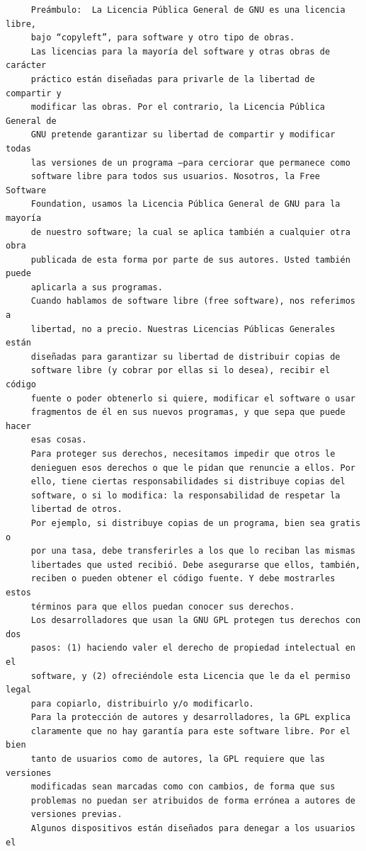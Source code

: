 \begin{verbatim}
     Preámbulo:  La Licencia Pública General de GNU es una licencia libre,
     bajo “copyleft”, para software y otro tipo de obras.
     Las licencias para la mayoría del software y otras obras de carácter
     práctico están diseñadas para privarle de la libertad de compartir y
     modificar las obras. Por el contrario, la Licencia Pública General de
     GNU pretende garantizar su libertad de compartir y modificar todas
     las versiones de un programa –para cerciorar que permanece como
     software libre para todos sus usuarios. Nosotros, la Free Software
     Foundation, usamos la Licencia Pública General de GNU para la mayoría
     de nuestro software; la cual se aplica también a cualquier otra obra
     publicada de esta forma por parte de sus autores. Usted también puede
     aplicarla a sus programas.
     Cuando hablamos de software libre (free software), nos referimos a
     libertad, no a precio. Nuestras Licencias Públicas Generales están
     diseñadas para garantizar su libertad de distribuir copias de
     software libre (y cobrar por ellas si lo desea), recibir el código
     fuente o poder obtenerlo si quiere, modificar el software o usar
     fragmentos de él en sus nuevos programas, y que sepa que puede hacer
     esas cosas.
     Para proteger sus derechos, necesitamos impedir que otros le
     denieguen esos derechos o que le pidan que renuncie a ellos. Por
     ello, tiene ciertas responsabilidades si distribuye copias del
     software, o si lo modifica: la responsabilidad de respetar la
     libertad de otros.
     Por ejemplo, si distribuye copias de un programa, bien sea gratis o
     por una tasa, debe transferirles a los que lo reciban las mismas
     libertades que usted recibió. Debe asegurarse que ellos, también,
     reciben o pueden obtener el código fuente. Y debe mostrarles estos
     términos para que ellos puedan conocer sus derechos.
     Los desarrolladores que usan la GNU GPL protegen tus derechos con dos
     pasos: (1) haciendo valer el derecho de propiedad intelectual en el
     software, y (2) ofreciéndole esta Licencia que le da el permiso legal
     para copiarlo, distribuirlo y/o modificarlo.
     Para la protección de autores y desarrolladores, la GPL explica
     claramente que no hay garantía para este software libre. Por el bien
     tanto de usuarios como de autores, la GPL requiere que las versiones
     modificadas sean marcadas como con cambios, de forma que sus
     problemas no puedan ser atribuidos de forma errónea a autores de
     versiones previas.
     Algunos dispositivos están diseñados para denegar a los usuarios el

\end{verbatim}
